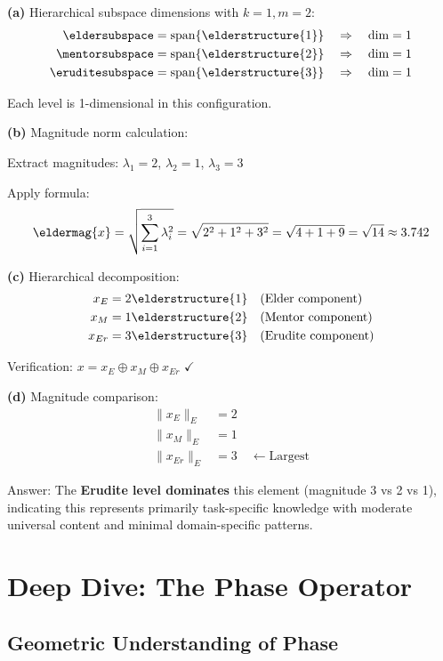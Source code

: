 \begin{solution}
\textbf{(a)} Hierarchical subspace dimensions with $k=1, m=2$:
\begin{align}
\eldersubspace &= \mathrm{span}\{\elderstructure{1}\} \quad \Rightarrow \quad \dim = 1\\
\mentorsubspace &= \mathrm{span}\{\elderstructure{2}\} \quad \Rightarrow \quad \dim = 1\\
\eruditesubspace &= \mathrm{span}\{\elderstructure{3}\} \quad \Rightarrow \quad \dim = 1
\end{align}

Each level is 1-dimensional in this configuration.

\textbf{(b)} Magnitude norm calculation:

Extract magnitudes: $\lambda_1 = 2$, $\lambda_2 = 1$, $\lambda_3 = 3$

Apply formula:
$$\eldermag{x} = \sqrt{\sum_{i=1}^{3} \lambda_i^2} = \sqrt{2^2 + 1^2 + 3^2} = \sqrt{4+1+9} = \sqrt{14} \approx 3.742$$

\textbf{(c)} Hierarchical decomposition:
\begin{align}
x_E &= 2\elderstructure{1} \quad \text{(Elder component)} \\
x_M &= 1\elderstructure{2} \quad \text{(Mentor component)} \\
x_{Er} &= 3\elderstructure{3} \quad \text{(Erudite component)}
\end{align}

Verification: $x = x_E \oplus x_M \oplus x_{Er}$ $\checkmark$

\textbf{(d)} Magnitude comparison:
\begin{align}
\|x_E\|_E &= 2 \\
\|x_M\|_E &= 1 \\
\|x_{Er}\|_E &= 3 \quad \leftarrow \text{Largest}
\end{align}

Answer: The \textbf{Erudite level dominates} this element (magnitude 3 vs 2 vs 1), indicating this represents primarily task-specific knowledge with moderate universal content and minimal domain-specific patterns.
\end{solution}

\section{Deep Dive: The Phase Operator}

\subsection{Geometric Understanding of Phase}


